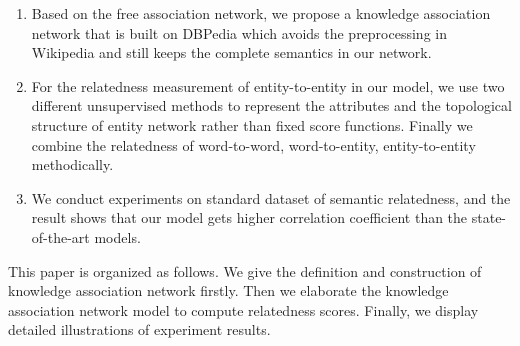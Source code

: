 \begin{enumerate}
\item Based on the free association network, we propose a knowledge association network that is built on DBPedia which avoids the preprocessing in
Wikipedia and still keeps the complete semantics in our network.

\item For the relatedness measurement of entity-to-entity in our model, we use two different unsupervised methods to
represent the attributes and the topological structure of entity network rather than fixed score functions.
Finally we combine the relatedness of word-to-word, word-to-entity, entity-to-entity methodically.

\item We conduct experiments on standard dataset of semantic relatedness, and the result shows that our model gets
higher correlation coefficient than the state-of-the-art models.
\end{enumerate}

This paper is organized as follows. We give the definition and construction of knowledge association network firstly.
Then we elaborate the knowledge association network model to compute relatedness scores. Finally, we display detailed
illustrations of experiment results.